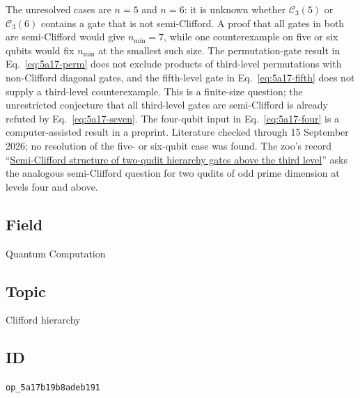 The unresolved cases are $n=5$ and $n=6$: it is unknown whether
$\mathcal{C}_3(5)$ or $\mathcal{C}_3(6)$ contains a gate that is not
semi-Clifford.  A proof that all gates in both are semi-Clifford would give
$n_{\min}=7$, while one counterexample on five or six qubits would fix
$n_{\min}$ at the smallest such size.  The permutation-gate result in
Eq.~\eqref{eq:5a17-perm} does not exclude products of third-level permutations
with non-Clifford diagonal gates, and the fifth-level gate in
Eq.~\eqref{eq:5a17-fifth} does not supply a third-level counterexample.  This
is a finite-size question; the unrestricted conjecture that all third-level
gates are semi-Clifford is already refuted by Eq.~\eqref{eq:5a17-seven}.  The
four-qubit input in Eq.~\eqref{eq:5a17-four} is a computer-assisted result in a
preprint.  Literature checked through 15 September 2026; no resolution of the
five- or six-qubit case was found.  The zoo's record
``\href{https://qiqc-op.com/problem/op_cdd1f718ccfbccf6/}{Semi-Clifford structure of two-qudit hierarchy gates above the third level}''
asks the analogous semi-Clifford question for two qudits of odd prime
dimension at levels four and above.

\subsection*{Field}

Quantum Computation

\subsection*{Topic}

Clifford hierarchy

\subsection*{ID}

\texttt{op\_5a17b19b8adeb191}
